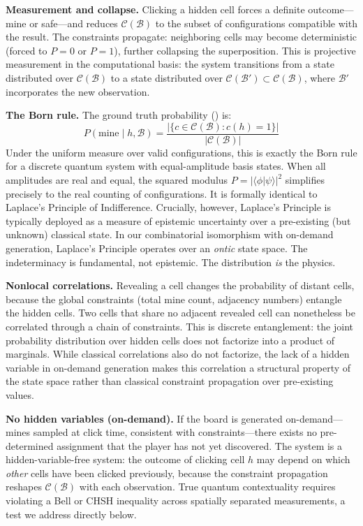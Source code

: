 \documentclass[12pt,a4paper]{article}
\begin{document}
\textbf{Measurement and collapse.} Clicking a hidden cell forces a definite outcome---mine or safe---and reduces $\mathcal{C}(\mathcal{B})$ to the subset of configurations compatible with the result. The constraints propagate: neighboring cells may become deterministic (forced to $P = 0$ or $P = 1$), further collapsing the superposition. This is projective measurement in the computational basis: the system transitions from a state distributed over $\mathcal{C}(\mathcal{B})$ to a state distributed over $\mathcal{C}(\mathcal{B}') \subset \mathcal{C}(\mathcal{B})$, where $\mathcal{B}'$ incorporates the new observation.

\textbf{The Born rule.} The ground truth probability () is:
\[
P(\text{mine} \mid h, \mathcal{B}) = \frac{|\{c \in \mathcal{C}(\mathcal{B}) : c(h) = 1\}|}{|\mathcal{C}(\mathcal{B})|}
\]
Under the uniform measure over valid configurations, this is exactly the Born rule for a discrete quantum system with equal-amplitude basis states. When all amplitudes are real and equal, the squared modulus $P = |\langle \phi | \psi \rangle|^2$ simplifies precisely to the real counting of configurations. It is formally identical to Laplace's Principle of Indifference. Crucially, however, Laplace's Principle is typically deployed as a measure of epistemic uncertainty over a pre-existing (but unknown) classical state. In our combinatorial isomorphism with on-demand generation, Laplace's Principle operates over an \emph{ontic} state space. The indeterminacy is fundamental, not epistemic. The distribution \emph{is} the physics.

\textbf{Nonlocal correlations.} Revealing a cell changes the probability of distant cells, because the global constraints (total mine count, adjacency numbers) entangle the hidden cells. Two cells that share no adjacent revealed cell can nonetheless be correlated through a chain of constraints. This is discrete entanglement: the joint probability distribution over hidden cells does not factorize into a product of marginals. While classical correlations also do not factorize, the lack of a hidden variable in on-demand generation makes this correlation a structural property of the state space rather than classical constraint propagation over pre-existing values.

\textbf{No hidden variables (on-demand).} If the board is generated on-demand---mines sampled at click time, consistent with constraints---there exists no pre-determined assignment that the player has not yet discovered. The system is a hidden-variable-free system: the outcome of clicking cell $h$ may depend on which \emph{other} cells have been clicked previously, because the constraint propagation reshapes $\mathcal{C}(\mathcal{B})$ with each observation. True quantum contextuality requires violating a Bell or CHSH inequality across spatially separated measurements, a test we address directly below.
\end{document}
